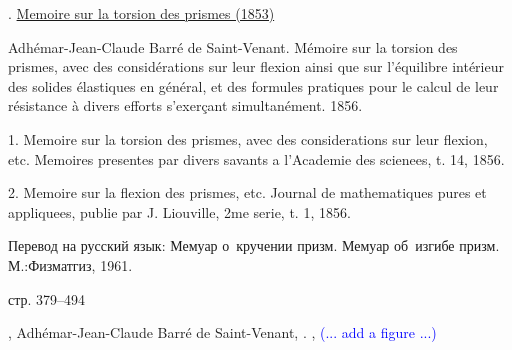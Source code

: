 

\label{section:twistingofrods.saintvenant}

\begin{otherlanguage}{russian}

{\small


.
\href{https://babel.hathitrust.org/cgi/pt?id=hvd.32044091959866&seq=7}{Memoire sur la torsion des prismes (1853)}

Adhémar-Jean-Claude Barré de Saint\hbox{-\hspace{-0.2ex}}Venant.
Mémoire sur la torsion des prismes, avec des considérations sur leur flexion ainsi que sur l'équilibre intérieur des solides élastiques en général, et des formules pratiques pour le calcul de leur résistance à divers efforts s’exerçant simultanément.
1856.

1. Memoire sur la torsion des prismes, avec des considerations sur leur flexion, etc. Memoires presentes par divers savants a l'Academie des scienees, t. 14, 1856.

2. Memoire sur la flexion des prismes, etc. Journal de mathematiques pures et appliquees, publie par J. Liouville, 2me serie, t. 1, 1856.

Перевод на русский язык:
Мемуар о~кручении призм. Мемуар об~изгибе призм.
М.:\;Физ\-мат\-гиз, 1961.

стр. 379--494
\par}

\end{otherlanguage}

,
Adhémar-Jean-Claude Barré de Saint\hbox{-\hspace{-0.2ex}}Venant,
.
 
,
\textcolor{blue}{(... add a figure ...)}

